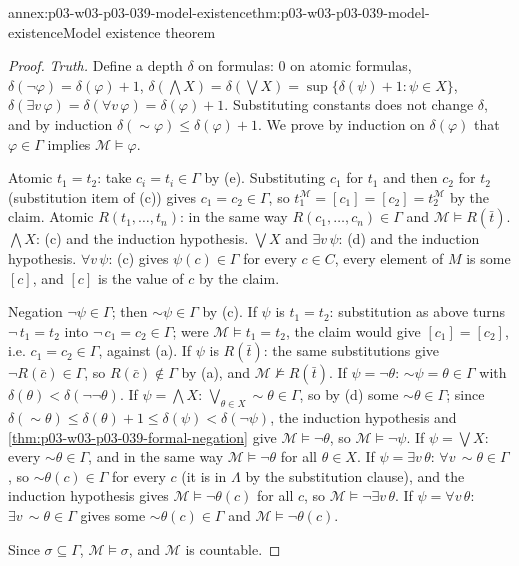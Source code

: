 \begin{annexitem}{annex:p03-w03-p03-039-model-existence}{thm:p03-w03-p03-039-model-existence}{Model existence theorem}
\begin{proof}
\emph{Truth.} Define a depth \(\delta\) on formulas: \(0\) on atomic formulas,
\(\delta(\neg\varphi)=\delta(\varphi)+1\),
\(\delta(\bigwedge X)=\delta(\bigvee X)=\sup\{\delta(\psi)+1:\psi\in X\}\),
\(\delta(\exists v\,\varphi)=\delta(\forall v\,\varphi)=\delta(\varphi)+1\).
Substituting constants does not change \(\delta\), and by induction
\(\delta({\sim}\varphi)\le\delta(\varphi)+1\). We prove by induction on
\(\delta(\varphi)\) that \(\varphi\in\Gamma\) implies \(\mathcal M\models\varphi\).

Atomic \(t_1=t_2\): take \(c_i=t_i\in\Gamma\) by (e). Substituting \(c_1\) for
\(t_1\) and then \(c_2\) for \(t_2\) (substitution item of (c)) gives
\(c_1=c_2\in\Gamma\), so \(t_1^{\mathcal M}=[c_1]=[c_2]=t_2^{\mathcal M}\) by the
claim. Atomic \(R(t_1,\ldots,t_n)\): in the same way \(R(c_1,\ldots,c_n)\in\Gamma\)
and \(\mathcal M\models R(\bar t)\). \(\bigwedge X\): (c) and the induction
hypothesis. \(\bigvee X\) and \(\exists v\,\psi\): (d) and the induction
hypothesis. \(\forall v\,\psi\): (c) gives \(\psi(c)\in\Gamma\) for every
\(c\in C\), every element of \(M\) is some \([c]\), and \([c]\) is the
value of \(c\) by the claim.

Negation \(\neg\psi\in\Gamma\); then \({\sim}\psi\in\Gamma\) by (c). If
\(\psi\) is \(t_1=t_2\): substitution as above turns \(\neg\,t_1=t_2\) into
\(\neg\,c_1=c_2\in\Gamma\); were \(\mathcal M\models t_1=t_2\), the claim
would give \([c_1]=[c_2]\), i.e. \(c_1=c_2\in\Gamma\), against (a). If
\(\psi\) is \(R(\bar t)\): the same substitutions give \(\neg R(\bar c)\in\Gamma\), so
\(R(\bar c)\notin\Gamma\) by (a), and \(\mathcal M\not\models R(\bar t)\).
If \(\psi=\neg\theta\): \({\sim}\psi=\theta\in\Gamma\) with
\(\delta(\theta)<\delta(\neg\neg\theta)\). If \(\psi=\bigwedge X\):
\(\bigvee_{\theta\in X}{\sim}\theta\in\Gamma\), so by (d) some
\({\sim}\theta\in\Gamma\); since
\(\delta({\sim}\theta)\le\delta(\theta)+1\le\delta(\psi)<\delta(\neg\psi)\),
the induction hypothesis and \cref{thm:p03-w03-p03-039-formal-negation}
give \(\mathcal M\models\neg\theta\), so \(\mathcal M\models\neg\psi\). If
\(\psi=\bigvee X\): every \({\sim}\theta\in\Gamma\), and in the same way
\(\mathcal M\models\neg\theta\) for all \(\theta\in X\). If
\(\psi=\exists v\,\theta\): \(\forall v\,{\sim}\theta\in\Gamma\), so
\({\sim}\theta(c)\in\Gamma\) for every \(c\) (it is in \(\Lambda\) by the
substitution clause), and the induction hypothesis gives
\(\mathcal M\models\neg\theta(c)\) for all \(c\), so
\(\mathcal M\models\neg\exists v\,\theta\). If \(\psi=\forall v\,\theta\):
\(\exists v\,{\sim}\theta\in\Gamma\) gives some \({\sim}\theta(c)\in\Gamma\)
and \(\mathcal M\models\neg\theta(c)\).

Since \(\sigma\subseteq\Gamma\), \(\mathcal M\models\sigma\), and \(\mathcal M\)
is countable.
\end{proof}
\end{annexitem}

